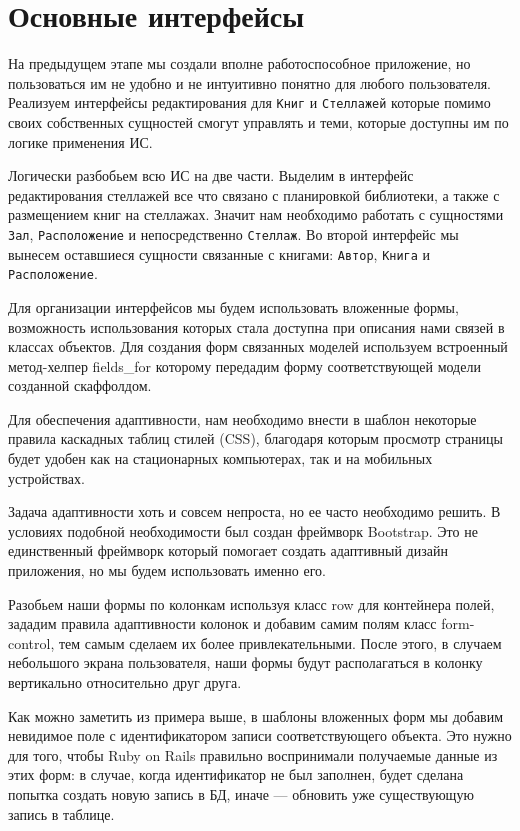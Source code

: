 \section{Основные интерфейсы}

На предыдущем этапе мы создали вполне работоспособное приложение, но
пользоваться им не удобно и не интуитивно понятно для любого пользователя.
Реализуем интерфейсы редактирования для \verb|Книг| и \verb|Стеллажей|
которые помимо своих собственных сущностей смогут управлять и теми, которые
доступны им по логике применения ИС.

Логически разбобьем всю ИС на две части. Выделим в интерфейс редактирования
стеллажей все что связано с планировкой библиотеки, а также с размещением
книг на стеллажах. Значит нам необходимо работать с сущностями \verb|Зал|,
\verb|Расположение| и непосредственно \verb|Стеллаж|. Во второй интерфейс мы
вынесем оставшиеся сущности связанные с книгами: \verb|Автор|, \verb|Книга|
и \verb|Расположение|.

Для организации интерфейсов мы будем использовать вложенные формы, возможность
использования которых стала доступна при описания нами связей в классах объектов.
Для создания форм связанных моделей используем встроенный метод-хелпер
fields\_for которому передадим форму соответствующей модели созданной
скаффолдом.

Для обеспечения адаптивности, нам необходимо внести в шаблон некоторые
правила каскадных таблиц стилей (CSS), благодаря которым просмотр страницы
будет удобен как на стационарных компьютерах, так и на мобильных устройствах.

Задача адаптивности хоть и совсем непроста, но ее часто необходимо решить.
В условиях подобной необходимости был создан фреймворк Bootstrap.
Это не единственный фреймворк который помогает создать адаптивный
дизайн приложения, но мы будем использовать именно его.

Разобьем наши формы по колонкам используя класс row для контейнера
полей, зададим правила адаптивности колонок и добавим самим полям
класс form-control, тем самым сделаем их более привлекательными.
После этого, в случаем небольшого экрана пользователя, наши формы
будут располагаться в колонку вертикально относительно друг друга.

\begin{small}

\end{small}

Как можно заметить из примера выше, в шаблоны вложенных форм мы добавим
невидимое поле с идентификатором записи соответствующего объекта. Это
нужно для того, чтобы Ruby on Rails правильно воспринимали получаемые
данные из этих форм: в случае, когда идентификатор не был заполнен,
будет сделана попытка создать новую запись в БД, иначе --- обновить уже
существующую запись в таблице.

